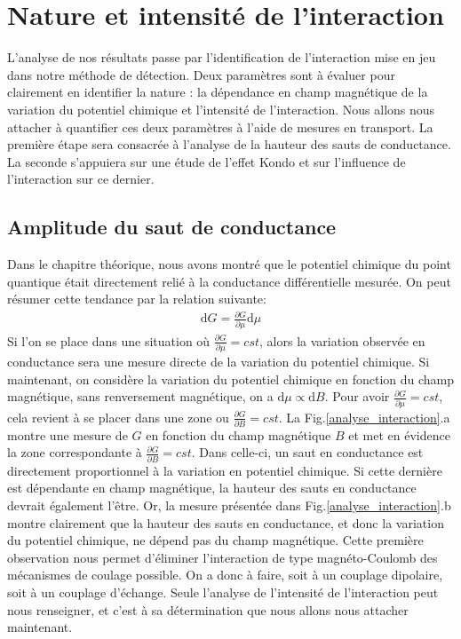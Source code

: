 \section{Nature et intensité de l'interaction}
L'analyse de nos résultats passe par l'identification de l'interaction mise en jeu dans notre méthode de détection. Deux paramètres sont à évaluer pour clairement en identifier la nature : la dépendance en champ magnétique de la variation du potentiel chimique et l'intensité de l'interaction. Nous allons nous attacher à quantifier ces deux paramètres à l'aide de mesures en transport. La première étape sera consacrée à l'analyse de la hauteur des sauts de conductance. La seconde s'appuiera sur une étude de l'effet Kondo et sur l'influence de l'interaction sur ce dernier.

\subsection{Amplitude du saut de conductance}
Dans le chapitre théorique, nous avons montré que le potentiel chimique du point quantique était directement relié à la conductance différentielle mesurée. On peut résumer cette tendance par la relation suivante:
\begin{eqnarray}
\text{d}G = \frac{\partial G}{\partial \mu} \text{d} \mu
\end{eqnarray}
Si l'on se place dans une situation où $\frac{\partial G}{\partial \mu} = cst$, alors la variation observée en conductance sera une mesure directe de la variation du potentiel chimique. Si maintenant, on considère la variation du potentiel chimique en fonction du champ magnétique, sans renversement magnétique, on a $\text{d}\mu \propto \text{d}B$. Pour avoir $\frac{\partial G}{\partial \mu} = cst$, cela revient à se placer dans une zone ou $\frac{\partial G}{\partial B} = cst$. La Fig.\ref{analyse_interaction}.a montre une mesure de $G$ en fonction du champ magnétique $B$ et met en évidence la zone correspondante à $\frac{\partial G}{\partial B} = cst$. Dans celle-ci, un saut en conductance est directement proportionnel à la variation en potentiel chimique. Si cette dernière est dépendante en champ magnétique, la hauteur des sauts en conductance devrait également l’être. Or, la mesure présentée dans Fig.\ref{analyse_interaction}.b montre clairement que la hauteur des sauts en conductance, et donc la variation du potentiel chimique, ne dépend pas du champ magnétique. Cette première observation nous permet d'éliminer l'interaction de type magnéto-Coulomb des mécanismes de coulage possible. On a donc à faire, soit à un couplage dipolaire, soit à un couplage d'échange. Seule l'analyse de l'intensité de l'interaction peut nous renseigner, et c'est à sa détermination que nous allons nous attacher maintenant.

